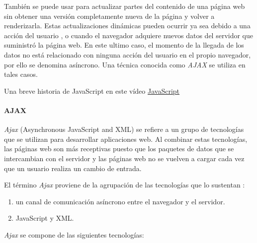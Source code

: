 También se puede usar para actualizar partes del contenido de una página web sin
obtener una versión completamente nueva de la página y volver a renderizarla. Estas actualizaciones dinámicas pueden ocurrir ya sea debido a una acción del usuario , o cuando
el navegador adquiere nuevos datos del servidor que suministró la página web. 
En este ultimo caso,  el momento de la llegada de los datos no está relacionado con ninguna acción del usuario en el propio navegador, por ello se denomina asíncrono. Una técnica conocida como \textit{AJAX}  se utiliza en tales casos.

 
\begin{tcolorbox}
	[colback=red!5!white,colframe=red!75!black,fonttitle=\bfseries,title=JavaScript]
	Una breve historia de JavaScript en este vídeo \href{https://www.youtube.com/watch?v=i18gWXhv5aA}{JavaScript}
\end{tcolorbox}


\paragraph{AJAX}
 

\textit{Ajax} (Asynchronous JavaScript and XML) \cite{Asleson2005} se refiere a un grupo de tecnologías que se utilizan para desarrollar aplicaciones web. Al combinar estas tecnologías, las páginas web son más receptivas puesto que los paquetes  de datos que se intercambian con el servidor y las páginas web no se vuelven a cargar cada vez que un usuario realiza un cambio de entrada. 

El término \textit{Ajax}  proviene de la agrupación de las tecnologías que lo sustentan \cite{Gehtland2006}: 
\begin{enumerate}
	\item un canal de comunicación asíncrono entre el navegador y el servidor.
	\item JavaScript y XML.
\end{enumerate}

\textit{Ajax} se compone de las siguientes tecnologías:

